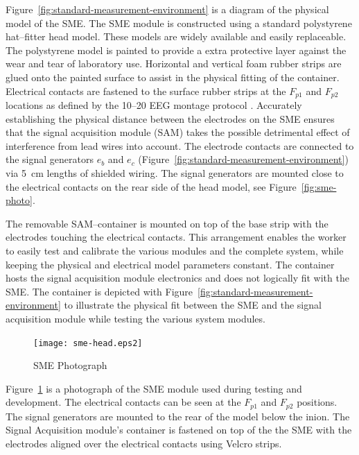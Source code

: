 Figure~\vref{fig:standard-measurement-environment} is a diagram of the
physical model of the SME. The SME module is constructed using a
standard polystyrene hat--fitter head model. These models are widely
available and easily replaceable. The polystyrene model is painted to
provide a extra protective layer against the wear and tear of
laboratory use.  Horizontal and vertical foam rubber strips are glued
onto the painted surface to assist in the physical fitting of the
container. Electrical contacts are fastened to the surface rubber
strips at the $F_{p1}$ and $F_{p2}$ locations as defined by the 10--20
EEG montage protocol
\cite[p3-4]{eeghand}. Accurately establishing the physical distance
between the electrodes on the SME ensures that the signal acquisition
module (SAM) takes the possible detrimental effect of interference
from lead wires into account. The electrode contacts are connected to
the signal generators $e_b$ and $e_c$
(Figure~\ref{fig:standard-measurement-environment}) via 5~cm lengths
of shielded wiring. The signal generators are mounted close to the
electrical contacts on the rear side of the head model, see
Figure~\vref{fig:sme-photo}.


The removable SAM--container is mounted on top of the base strip with
the electrodes touching the electrical contacts. This arrangement
enables the worker to easily test and calibrate the various modules
and the complete system, while keeping the physical and electrical
model parameters constant. The container hosts the signal acquisition
module electronics and does not logically fit with the SME. The
container is depicted with
Figure~\ref{fig:standard-measurement-environment} to illustrate the
physical fit between the SME and the signal acquisition module while
testing the various system modules.

\begin{figure}[htbp]
\begin{center}
	\texttt{[image: sme-head.eps2]}
	\caption{SME Photograph}
\label{fig:sme-photo}
\end{center}
\end{figure}

Figure~\ref{fig:sme-photo} is a photograph of the SME module used
during testing and development. The electrical contacts can be seen at
the $F_{p1}$ and $F_{p2}$ positions. The signal generators are
mounted to the rear of the model below the inion. The Signal
Acquisition module's container is fastened on top of the the SME with
the electrodes aligned over the electrical contacts using Velcro
strips.



